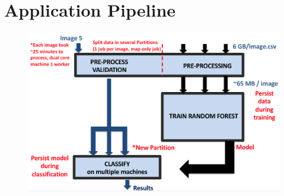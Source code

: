 \documentclass{neu_handout}
\begin{document}
\section{Application Pipeline}
\begin{figure}[!h]
  \includegraphics[width=0.7\linewidth]{pipeline}
  \label{fig:pipeline}
\end{figure}
\end{document}
